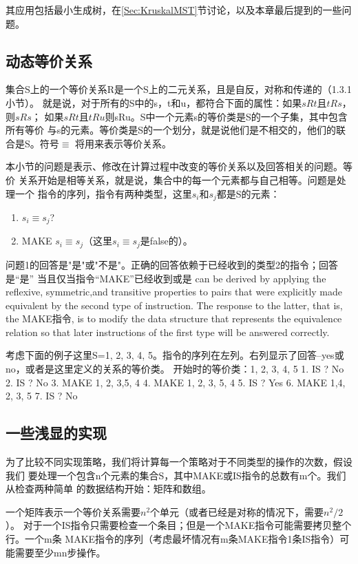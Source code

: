 其应用包括最小生成树，在\ref{Sec:KruskalMST}节讨论，以及本章最后提到的一些问题。

\subsection{动态等价关系}
集合S上的一个等价关系R是一个S上的二元关系，且是自反，对称和传递的（1.3.1小节）。
就是说，对于所有的S中的s，t和u，都符合下面的属性：如果$sRt$且$tRs$，则$sRs$；
如果$sRt$且$tRu$则sRu。S中一个元素s的等价类是S的一个子集，其中包含所有等价
与s的元素。等价类是S的一个划分，就是说他们是不相交的，他们的联合是S。符号$\equiv$
将用来表示等价关系。

本小节的问题是表示、修改在计算过程中改变的等价关系以及回答相关的问题。等价
关系开始是相等关系，就是说，集合中的每一个元素都与自己相等。问题是处理一个
指令的序列，指令有两种类型，这里$s_i$和$s_j$都是S的元素：
\begin{enumerate}
\item $s_i \equiv s_j$?
\item MAKE $s_i\equiv s_j$（这里$s_i \equiv s_j$是false的）。
\end{enumerate}
问题1的回答是"是"或"不是"。正确的回答依赖于已经收到的类型2的指令；回答是“是”
当且仅当指令“MAKE”已经收到或是 can be derived by applying the reflexive,
symmetric,and transitive properties to pairs that were explicitly made equivalent
by the second type of instruction. The response to the latter, that is, the MAKE指令,
is to modify the data structure that represents the equivalence relation
so that later instructions of the first type will be answered correctly.

考虑下面的例子这里S={1, 2, 3, 4, 5}。指令的序列在左列。右列显示了回答--yes或no，或者是这里定义的关系的等价类。
开始时的等价类：{1}, {2}, {3}, {4}, {5}
1.  IS  ?                   No
2.  IS  ?                   No
3.  MAKE            {1}, {2}, {3,5}, {4}
4.  MAKE            {1}, {2, 3, 5}, {4}
5.  IS ?                    Yes
6.  MAKE                {1,4}, {2, 3, 5}
7.  IS  ?               No


\subsection{一些浅显的实现}
为了比较不同实现策略，我们将计算每一个策略对于不同类型的操作的次数，假设我们
要处理一个包含n个元素的集合S，其中MAKE或IS指令的总数有m个。我们从检查两种简单
的数据结构开始：矩阵和数组。

一个矩阵表示一个等价关系需要$n^2$个单元（或者已经是对称的情况下，需要$n^2/2$）。
对于一个IS指令只需要检查一个条目；但是一个MAKE指令可能需要拷贝整个行。一个m条
MAKE指令的序列（考虑最坏情况有m条MAKE指令1条IS指令）可能需要至少mn步操作。

